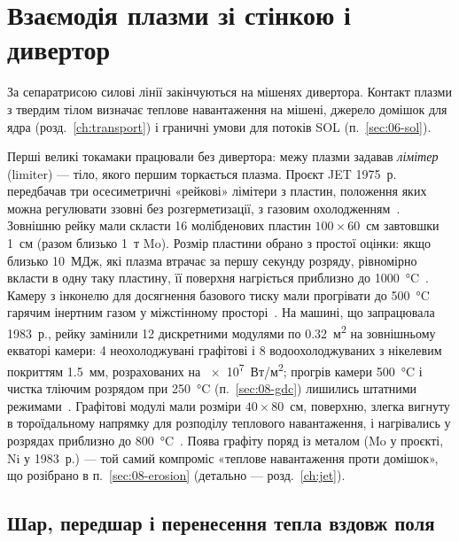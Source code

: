 \chapter{Взаємодія плазми зі стінкою і дивертор}\label{ch:wall}

За сепаратрисою силові лінії закінчуються на мішенях дивертора. Контакт плазми з твердим тілом визначає теплове навантаження на мішені, джерело домішок для ядра (розд.~\ref{ch:transport}) і граничні умови для потоків SOL (п.~\ref{sec:06-sol}).

\begin{corpusexample}
Перші великі токамаки працювали без дивертора: межу плазми задавав \emph{лімітер} (limiter) --- тіло, якого першим торкається плазма. Проєкт JET 1975~р. передбачав три осесиметричні «рейкові» лімітери з пластин, положення яких можна регулювати ззовні без розгерметизації, з газовим охолодженням~\cite[с.~301]{JET1975}. Зовнішню рейку мали скласти 16 молібденових пластин $100\times60$~см завтовшки \SI{1}{см} (разом близько \SI{1}{т} Mo). Розмір пластини обрано з простої оцінки: якщо близько \SI{10}{МДж}, які плазма втрачає за першу секунду розряду, рівномірно вкласти в одну таку пластину, її поверхня нагріється приблизно до \SI{1000}{\celsius}~\cite[с.~314]{JET1975}. Камеру з інконелю для досягнення базового тиску мали прогрівати до \SI{500}{\celsius} гарячим інертним газом у міжстінному просторі~\cite[с.~299, 301]{JET1975}. На машині, що запрацювала 1983~р., рейку замінили 12 дискретними модулями по \SI{0.32}{м^2} на зовнішньому екваторі камери: 4 неохолоджувані графітові і 8 водоохолоджуваних з нікелевим покриттям \SI{1.5}{мм}, розрахованих на \SI{e7}{Вт/м^2}; прогрів камери \SI{500}{\celsius} і чистка тліючим розрядом при \SI{250}{\celsius} (п.~\ref{sec:08-gdc}) лишились штатними режимами~\cite[с.~24]{JETJU1983}. Графітові модулі мали розміри $40\times80$~см, поверхню, злегка вигнуту в тороїдальному напрямку для розподілу теплового навантаження, і нагрівались у розрядах приблизно до \SI{800}{\celsius}~\cite[с.~135]{Wesson1999}. Поява графіту поряд із металом (Mo у проєкті, Ni у 1983~р.) --- той самий компроміс «теплове навантаження проти домішок», що розібрано в п.~\ref{sec:08-erosion} (детально --- розд.~\ref{ch:jet}).
\end{corpusexample}

\section{Шар, передшар і перенесення тепла вздовж поля}\label{sec:08-sheath}


